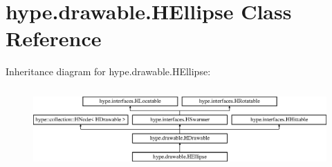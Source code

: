 \hypertarget{classhype_1_1drawable_1_1_h_ellipse}{\section{hype.\-drawable.\-H\-Ellipse Class Reference}
\label{classhype_1_1drawable_1_1_h_ellipse}
}
Inheritance diagram for hype.\-drawable.\-H\-Ellipse\-:\begin{figure}[H]
\begin{center}
\leavevmode
\includegraphics[height=3.111111cm]{classhype_1_1drawable_1_1_h_ellipse}
\end{center}
\end{figure}
